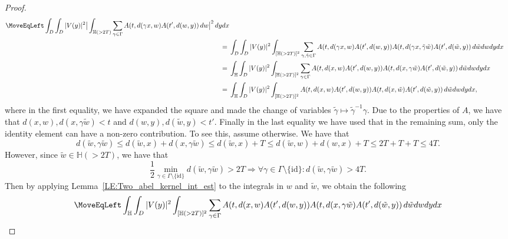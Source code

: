 \documentclass[11pt,twoside,reqno]{amsart}
\newcommand{\1}{\mathrm{\mathbf{1}}}
\numberwithin{equation}{section}
\theoremstyle{plain}
\theoremstyle{definition}
\theoremstyle{remark}
\begin{document}
\begin{proof}
\begin{equation}\label{Eq:K_Gamma_3}
    \begin{aligned}
    \MoveEqLeft \int_D \int_D |V(y) |^2 \big| \int_{\mathbb{H}( > 2T)} \sum_{\gamma \in \Gamma } A(t, d( \gamma x, w) A(t', d( w, y )) \, d w  \big|^2 \, d yd x
    \\
    ={}&\int_D  \int_D |V(y) |^2 \int_{[\mathbb{H}( > 2T)]^2} \sum_{\gamma, \tilde{\gamma} \in \Gamma } A(t, d( \gamma x, w) A(t', d( w, y )) A(t, d( \gamma x, \tilde{\gamma} \tilde{w}) A(t', d( \tilde{w}, y )) \, d \tilde{w} d w  d yd x
    \\
    ={}&\int_{\mathbb{H}} \int_D |V(y) |^2  \int_{[\mathbb{H}( > 2T)]^2}  \sum_{\gamma \in \Gamma } A(t, d(x, w) A(t', d( w, y )) A(t, d(x, \gamma \tilde{w}) A(t', d( \tilde{w}, y )) \, d \tilde{w} d w  d yd x
    \\
    ={}&\int_{\mathbb{H}} \int_D |V(y) |^2  \int_{[\mathbb{H}( > 2T)]^2}   A(t, d(x, w) A(t', d( w, y )) A(t, d(x, \tilde{w}) A(t', d( \tilde{w}, y )) \, d \tilde{w} d w  d yd x,
    \end{aligned}
\end{equation}
where in the first equality, we have expanded the square and made the change of variables $\tilde{\gamma} \mapsto \tilde{\gamma}^{-1} \gamma $. Due to the properties of $A$, we have that $d(x,w), d(x, \gamma \tilde{w}) < t$ and $d(w,y), d(\tilde{w},y) < t'$. Finally in the last equality we have used that in the remaining sum, only the identity element can have a non-zero contribution. To see this, assume otherwise. We have that 
\begin{equation*}
    d( \tilde{w}, \gamma \tilde{w}) \leq d( \tilde{w}, x) + d(x, \gamma \tilde{w}) \leq d(\tilde{w},x) + T \leq d(\tilde{w}, w) + d(w,x) + T \leq 2T + T + T \leq 4T.
\end{equation*}
However, since $\tilde{w} \in \mathbb{H}(>2T)$, we have that
\begin{equation*}
    \frac{1}{2} \min_{ \gamma \in \Gamma \setminus\{ \mathrm{id} \} } d( \tilde{w}, \gamma \tilde{w} ) > 2T \Rightarrow \forall \gamma \in \Gamma \setminus \{\mathrm{id} \} : d(\tilde{w}, \gamma \tilde{w}) > 4T.
\end{equation*}
Then by applying Lemma~\ref{LE:Two_abel_kernel_int_est} to the integrals in $w$ and $\tilde{w}$, we obtain the following
\begin{equation}\label{Eq:K_Gamma_4}
    \begin{aligned}
    \MoveEqLeft \int_{\mathbb{H}} \int_D |V(y) |^2  \int_{[\mathbb{H}( > 2T)]^2}  \sum_{\gamma \in \Gamma } A(t, d(x, w) A(t', d( w, y )) A(t, d(x, \gamma \tilde{w}) A(t', d( \tilde{w}, y )) \, d \tilde{w} d w  d yd x

\end{aligned}
\end{equation}
\end{proof}
\end{document}
